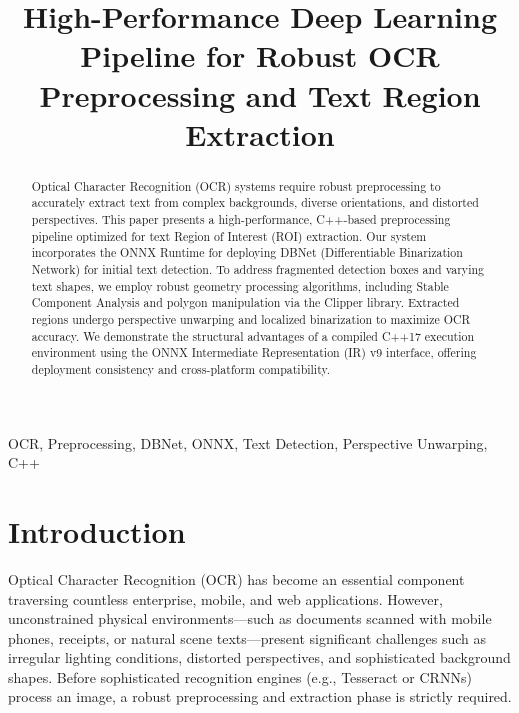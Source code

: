 \documentclass[conference]{IEEEtran}
\begin{document}
\title{High-Performance Deep Learning Pipeline for Robust OCR Preprocessing and Text Region Extraction}

\author{
\and
{}
}

\maketitle

\begin{abstract}
Optical Character Recognition (OCR) systems require robust preprocessing to accurately extract text from complex backgrounds, diverse orientations, and distorted perspectives. This paper presents a high-performance, C++-based preprocessing pipeline optimized for text Region of Interest (ROI) extraction. Our system incorporates the ONNX Runtime for deploying DBNet (Differentiable Binarization Network) for initial text detection. To address fragmented detection boxes and varying text shapes, we employ robust geometry processing algorithms, including Stable Component Analysis and polygon manipulation via the Clipper library. Extracted regions undergo perspective unwarping and localized binarization to maximize OCR accuracy. We demonstrate the structural advantages of a compiled C++17 execution environment using the ONNX Intermediate Representation (IR) v9 interface, offering deployment consistency and cross-platform compatibility. 
\end{abstract}

\begin{IEEEkeywords}
OCR, Preprocessing, DBNet, ONNX, Text Detection, Perspective Unwarping, C++
\end{IEEEkeywords}

\section{Introduction}
Optical Character Recognition (OCR) has become an essential component traversing countless enterprise, mobile, and web applications. However, unconstrained physical environments—such as documents scanned with mobile phones, receipts, or natural scene texts—present significant challenges such as irregular lighting conditions, distorted perspectives, and sophisticated background shapes. Before sophisticated recognition engines (e.g., Tesseract or CRNNs) process an image, a robust preprocessing and extraction phase is strictly required.
\end{document}
